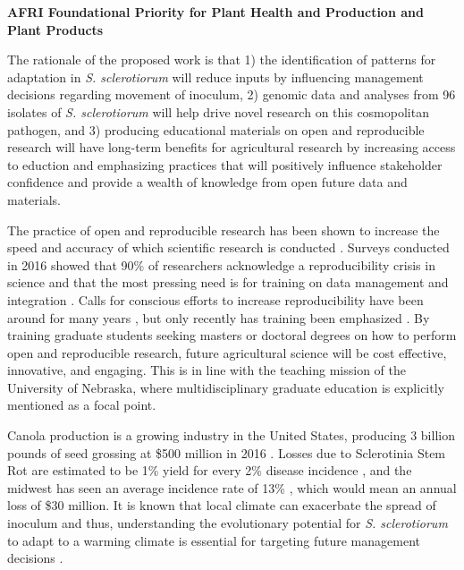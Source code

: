 \documentclass[12pt,letterpaper]{article}
\begin{document}

\noindent
\textbf{AFRI Foundational Priority for Plant Health and Production and Plant Products}

The rationale of the proposed work is that 1) the identification of patterns for adaptation in \textit{S. sclerotiorum} will reduce inputs by influencing management decisions regarding movement of inoculum, 2) genomic data and analyses from 96 isolates of \textit{S. sclerotiorum} will help drive novel research on this cosmopolitan pathogen, and 3) producing educational materials on open and reproducible research will have long-term benefits for agricultural research by increasing access to eduction and emphasizing practices that will positively influence stakeholder confidence and provide a wealth of knowledge from open future data and materials. 

The practice of open and reproducible research has been shown to increase the speed and accuracy of which scientific research is conducted \citep{stewart-lowndes2017path, wilson2016good}.
Surveys conducted in 2016 showed that 90\% of researchers acknowledge a reproducibility crisis in science \citep{baker2016scientists} and that the most pressing need is for training on data management and integration \citep{barone2017unmet}. 
Calls for conscious efforts to increase reproducibility have been around for many years \citep{buckheit1995wavelab, peng2011reproducible}, but only recently has training been emphasized \citep{schmidt2016stepping, stewart-lowndes2017path, wilson2016good}. 
By training graduate students seeking masters or doctoral degrees on how to perform open and reproducible research, future agricultural science will be cost effective, innovative, and engaging. 
This is in line with the teaching mission of the University of Nebraska, where multidisciplinary graduate education is explicitly mentioned as a focal point.

Canola production is a growing industry in the United States, producing 3 billion pounds of seed grossing at \$500 million in 2016 \citep{usda2017production, usda2017values}. Losses due to Sclerotinia Stem Rot are estimated to be 1\% yield for every 2\% disease incidence \citep{delrio2007impact}, and the midwest has seen an average incidence rate of 13\% \citep{markell2009sclerotinia}, which would mean an annual loss of \$30 million. 
It is known that local climate can exacerbate the spread of inoculum and thus, understanding the evolutionary potential for \textit{S. sclerotiorum} to adapt to a warming climate is essential for targeting future management decisions \citep{attanayake2014inferring,shea2000integrated,billiard2012sex}.
\end{document}
